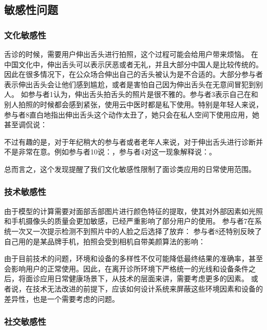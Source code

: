 \subsection{敏感性问题}

\subsubsection{文化敏感性}


舌诊的时候，需要用户伸出舌头进行拍照，这个过程可能会给用户带来烦恼。
在中国文化中，伸出舌头可以表示厌恶或者无礼，并且大部分中国人是比较传统的。因此在很多情况下，在公众场合伸出自己的舌头被认为是不合适的。大部分参与者表示伸出舌头会让他们感到尴尬，或者是害怕自己因为伸出舌头在无意间冒犯到别人。
如参与者1认为，伸出舌头拍舌头的照片是很不雅的。参与者3表示自己在和别人拍照的时候都会感到紧张，使用云中医时都是私下使用。特别是年轻人来说，参与者8直白地指出伸出舌头这个动作太丑了，她只会在私人空间下使用应用，她甚至调侃说：

不过有趣的是，对于年纪稍大的参与者或者老年人来说，对于伸出舌头进行诊断并不是非常在意。例如参与者10说：，参与者4对这一现象解释说：。 

总而言之，这个发现提醒了我们文化敏感性限制了面诊类应用的日常使用范围。


\subsubsection{技术敏感性}


由于模型的计算需要对面部舌部图片进行颜色特征的提取，使其对外部因素如光照和手机摄像头的质量会更加敏感，已经严重影响了部分用户的使用。
参与者7在系统一次又一次提示检测不到照片中的人脸之后选择了放弃：
参与者8还特别反映了自己用的是某品牌手机，拍照会受到相机自带美颜算法的影响：

由于目前技术的问题，环境和设备的多样性不仅可能降低最终结果的准确率，甚至会影响用户的正常使用。因此，在离开诊所环境下严格统一的光线和设备条件之后，将面诊应用日常健康场景下，从技术的层面来讲，需要考虑更多的因素。
或者说，在技术无法改进的前提下，应该如何设计系统来屏蔽这些环境因素和设备的差异性，也是一个需要考虑的问题。

\subsubsection{社交敏感性}


